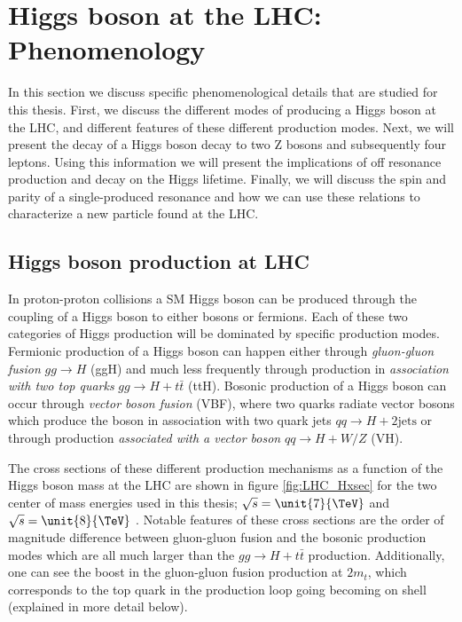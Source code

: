 \chapter{Higgs boson at the LHC: Phenomenology}
\label{sec:LHC_Pheno}


In this section we discuss specific phenomenological details that are studied for this thesis. First, we discuss the different modes of producing a Higgs boson at the LHC, and different features of these different production modes. Next, we will present the decay of a Higgs boson decay to two Z bosons and subsequently four leptons. Using this information we will present the implications of off resonance production and decay on the Higgs lifetime. Finally, we will discuss the spin and parity of a single-produced resonance and how we can use these relations to characterize a new particle found at the LHC.

\section{Higgs boson production at LHC}
\label{sec:Higgs_Production_Pheno}

In proton-proton collisions a SM Higgs boson can be produced through the coupling of a Higgs boson to either bosons or fermions. Each of these two categories of Higgs production will be dominated by specific production modes. Fermionic production of a Higgs boson can happen either through \textit{gluon-gluon fusion} $gg \to H$ (ggH) and much less frequently through production in \textit{association with two top quarks} $gg \to H + t\bar{t}$ (ttH). Bosonic production of a Higgs boson can occur through \textit{vector boson fusion} (VBF), where two quarks radiate vector bosons which produce the boson in association with two quark jets $qq \to H + 2\text{jets}$ or through production \textit{associated with a vector boson} $qq \to H + W/Z$ (VH).

The cross sections of these different production mechanisms as a function of the Higgs boson mass at the LHC are shown in figure \ref{fig:LHC_Hxsec} for the two center of mass energies used in this thesis; $\sqrt{s} = \unit{7}{\TeV}$ and $\sqrt{s} = \unit{8}{\TeV}$ \cite{Dittmaier:2011ti, Dittmaier:2012vm}. Notable features of these cross sections are the order of magnitude difference between gluon-gluon fusion and the bosonic production modes which are all much larger than the $gg \to H + t\bar{t}$ production. Additionally, one can see the boost in the gluon-gluon fusion production at $2m_{t}$, which corresponds to the top quark in the production loop going becoming on shell (explained in more detail below).

